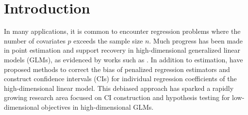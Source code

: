 \section{Introduction} \label{sec:intro}
In many applications, it is common to encounter regression problems where the number of covariates $p$ exceeds the sample size $n$. Much progress has been made in point estimation and support recovery in high-dimensional generalized linear models (GLMs), as evidenced by works such as \cite{buhlmann2011statistics, negahban2009unified, huang2012estimation, lasso, scad, mcp, slasso, sqlasso, srecov}. In addition to estimation,  \citet{van2014asymptotically, javanmard2014confidence, zhang2014confidence} have proposed methods to correct the bias of penalized regression estimators and construct confidence intervals  (CIs) for individual regression coefficients of the high-dimensional linear model. This debiased approach has sparked a rapidly growing research area focused on CI construction and hypothesis testing for low-dimensional objectives in high-dimensional GLMs.

